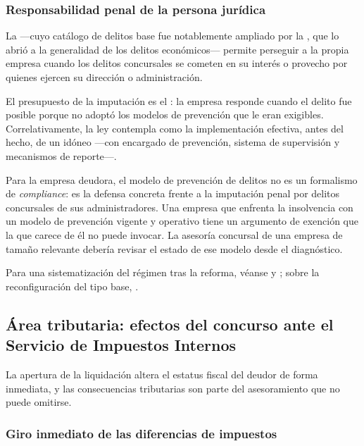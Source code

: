 \subsubsection{Responsabilidad penal de la persona jurídica}

La \Lrpj{} \citeyearpar{ley-20393} ---cuyo catálogo de delitos base fue notablemente ampliado por
la \Ldeleco{}, que lo abrió a la generalidad de los delitos económicos--- permite perseguir a la
propia empresa cuando los delitos concursales se cometen en su interés o provecho por quienes
ejercen su dirección o administración.

El presupuesto de la imputación es el : la empresa responde
cuando el delito fue posible porque no adoptó los modelos de prevención que le eran exigibles.
Correlativamente, la ley contempla como  la implementación
efectiva, antes del hecho, de un  idóneo ---con
encargado de prevención, sistema de supervisión y mecanismos de reporte---.

\begin{foco}
Para la empresa deudora, el modelo de prevención de delitos no es un formalismo de
\emph{compliance}: es la defensa concreta frente a la imputación penal por delitos concursales de
sus administradores. Una empresa que enfrenta la insolvencia con un modelo de prevención vigente
y operativo tiene un argumento de exención que la que carece de él no puede invocar. La asesoría
concursal de una empresa de tamaño relevante debería revisar el estado de ese modelo desde el
diagnóstico.
\end{foco}

Para una sistematización del régimen tras la reforma, véanse
\textcite{doc-delitos-economicos-garrigues} y \textcite{doc-delitos-economicos-prieto}; sobre la
reconfiguración del tipo base, \textcite{mayer-delitos-concursales}.

\subsection{Área tributaria: efectos del concurso ante el Servicio de Impuestos Internos}

La apertura de la liquidación altera el estatus fiscal del deudor de forma inmediata, y las
consecuencias tributarias son parte del asesoramiento que no puede omitirse.

\subsubsection{Giro inmediato de las diferencias de impuestos}

